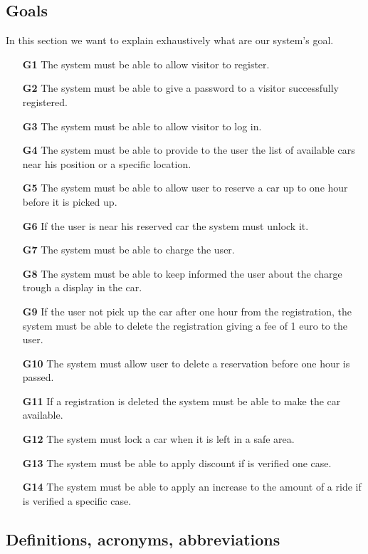 \subsection{Goals} \label{subsec:goals}
In this section we want to explain exhaustively what are our system's goal.
\begin{itemize}
\item[\textbf{G1}] The system must be able to allow visitor to register.
\item[\textbf{G2}] The system must be able to give a password to a visitor successfully registered.
\item[\textbf{G3}] The system must be able to allow visitor to log in.
\item[\textbf{G4}] The system must be able to provide to the user the list of available cars near his position or a specific location.
\item[\textbf{G5}] The system must be able to allow user to reserve a car up to one hour before it is picked up.
\item[\textbf{G6}] If the user is near his reserved car the system must unlock it.
\item[\textbf{G7}] The system must be able to charge the user.
\item[\textbf{G8}] The system must be able to keep informed the user about the charge trough a display in the car.
\item[\textbf{G9}] If the user not pick up the car after one hour from the registration, the system must be able to delete the registration giving a fee of 1 euro to the user.
\item[\textbf{G10}] The system must allow user to delete a reservation before one hour is passed.
\item[\textbf{G11}] If a registration is deleted the system must be able to make the car available.
\item[\textbf{G12}] The system must lock a car when it is left in a safe area.
\item[\textbf{G13}] The system must be able to apply discount if is verified one case.
\item[\textbf{G14}] The system must be able to apply an increase to the amount of a ride if is verified a specific case.


\end{itemize}


\subsection{Definitions, acronyms, abbreviations} \label{subsec:def-ac-ab}


